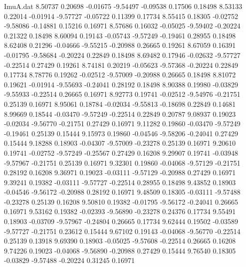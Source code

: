 \begin{filecontents}{ImuA.dat}
   8.50737    0.20698   -0.01675   -9.54497   -0.09538    0.17506    0.18498
   8.53133    0.22014   -0.01914   -9.57727   -0.05722    0.11399    0.17734
   8.55415    0.18305   -0.02752   -9.58086   -0.14881    0.15216    0.16971
   8.57686    0.16032   -0.05025   -9.59402   -0.20224    0.21322    0.18498
   8.60094    0.19143   -0.05743   -9.57249   -0.19461    0.28955    0.18498
   8.62408    0.21296   -0.04666   -9.55215   -0.20988    0.26665    0.19261
   8.67059    0.16391   -0.01795   -9.58684   -0.20224    0.22849    0.18498
   8.69482    0.17946   -0.02632   -9.57727   -0.22514    0.27429    0.19261
   8.74181    0.20219   -0.05623   -9.57368   -0.20224    0.22849    0.17734
   8.78776    0.19262   -0.02512   -9.57009   -0.20988    0.26665    0.18498
   8.81072    0.19621   -0.01914   -9.55693   -0.24041    0.28192    0.18498
   8.90388    0.19980   -0.03829   -9.55933   -0.22514    0.26665    0.16971
   8.92773    0.19741   -0.02512   -9.54976   -0.21751    0.25139    0.16971
   8.95061    0.18784   -0.02034   -9.55813   -0.18698    0.22849    0.14681
   8.99669    0.18544   -0.03470   -9.57249   -0.22514    0.22849    0.20787
   9.08937    0.19023   -0.02034   -9.56770   -0.21751    0.27429    0.16971
   9.11282    0.19860   -0.03470   -9.57249   -0.19461    0.25139    0.15444
   9.15973    0.19860   -0.04546   -9.58206   -0.24041    0.27429    0.15444
   9.18288    0.18903   -0.04307   -9.57009   -0.23278    0.25139    0.16971
   9.20610    0.19741   -0.02752   -9.57249   -0.25567    0.27429    0.16208
   9.29907    0.19741   -0.03948   -9.57967   -0.21751    0.25139    0.16971
   9.32301    0.19860   -0.04068   -9.57129   -0.21751    0.28192    0.16208
   9.36971    0.19023   -0.03111   -9.57129   -0.20988    0.27429    0.16971
   9.39241    0.19382   -0.03111   -9.57727   -0.22514    0.28955    0.18498
   9.43852    0.18903   -0.04546   -9.56172   -0.20988    0.28192    0.16971
   9.48509    0.18305   -0.03111   -9.57488   -0.23278    0.25139    0.16208
   9.50810    0.19382   -0.01795   -9.56172   -0.24041    0.26665    0.16971
   9.53162    0.19382   -0.02393   -9.56890   -0.23278    0.24376    0.17734
   9.55491    0.18903   -0.03709   -9.57967   -0.24804    0.26665    0.17734
   9.62444    0.19502   -0.03589   -9.57727   -0.21751    0.23612    0.15444
   9.67102    0.19143   -0.04068   -9.56770   -0.22514    0.25139    0.13918
   9.69390    0.18903   -0.05025   -9.57608   -0.22514    0.26665    0.16208
   9.74226    0.19023   -0.04068   -9.56890   -0.20988    0.27429    0.15444
   9.76540    0.18305   -0.03829   -9.57488   -0.20224    0.31245    0.16971

\end{filecontents}
